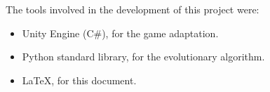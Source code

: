 The tools involved in the development of this project were:

\begin{itemize}
	\item Unity Engine (C\#), for the game adaptation.
	\item Python standard library, for the evolutionary algorithm.
	\item \LaTeX, for this document.
\end{itemize}


